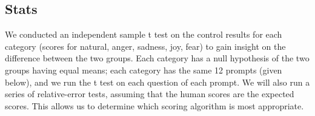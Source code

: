 \documentclass[11pt, twoside, reqno]{book}
\begin{document}
\subsection{Stats}

We conducted an independent sample t test on the control results for each category (scores for natural, anger, sadness, joy, fear) to gain insight on the difference between the two groups. Each category has a null hypothesis of the two groups having equal means; each category has the same 12 prompts (given below), and we run the t test on each question of each prompt. We will also run a series of relative-error tests, assuming that the human scores are the expected scores. This allows us to determine which scoring algorithm is most appropriate.
\end{document}
